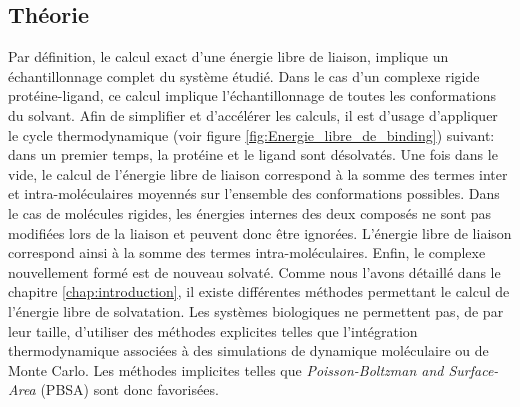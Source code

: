 \subsection{Théorie}
Par définition, le calcul exact d'une énergie libre de liaison, implique un échantillonnage complet du système étudié. Dans le cas d'un complexe rigide protéine-ligand, ce calcul implique l'échantillonnage de toutes les conformations du solvant. Afin de simplifier et d’accélérer les calculs, il est d'usage d'appliquer le cycle thermodynamique (voir figure \ref{fig:Energie_libre_de_binding}) suivant: dans un premier temps, la protéine et le ligand sont désolvatés. Une fois dans le vide, le calcul de l'énergie libre de liaison correspond à la somme des termes inter et intra-moléculaires moyennés sur l'ensemble des conformations possibles. Dans le cas de molécules rigides, les énergies internes des deux composés ne sont pas modifiées lors de la liaison et peuvent donc être ignorées. L'énergie libre de liaison correspond ainsi à la somme des termes intra-moléculaires. Enfin, le complexe nouvellement formé est de nouveau solvaté. Comme nous l'avons détaillé dans le chapitre \ref{chap:introduction}, il existe différentes méthodes permettant le calcul de l'énergie libre de solvatation. Les systèmes biologiques ne permettent pas, de par leur taille, d'utiliser des méthodes explicites telles que l'intégration thermodynamique associées à des simulations de dynamique moléculaire ou de Monte Carlo. Les méthodes implicites telles que \textit{Poisson-Boltzman and Surface-Area} (PBSA) sont donc favorisées.



